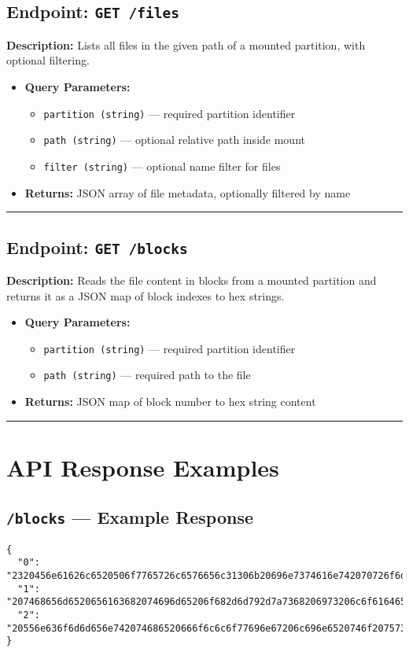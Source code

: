 \documentclass[12pt,a4paper]{article}
\begin{document}
\subsection*{Endpoint: \texttt{GET /files}}
\textbf{Description:} Lists all files in the given path of a mounted partition, with optional filtering.
\begin{itemize}[leftmargin=2cm,label={--}]
  \item \textbf{Query Parameters:}
  \begin{itemize}
    \item \texttt{partition (string)} — required partition identifier
    \item \texttt{path (string)} — optional relative path inside mount
    \item \texttt{filter (string)} — optional name filter for files
  \end{itemize}
  \item \textbf{Returns:} JSON array of file metadata, optionally filtered by name
\end{itemize}
\hrule\vspace{1em}

\subsection*{Endpoint: \texttt{GET /blocks}}
\textbf{Description:} Reads the file content in blocks from a mounted partition and returns it as a JSON map of block indexes to hex strings.
\begin{itemize}[leftmargin=2cm,label={--}]
  \item \textbf{Query Parameters:}
  \begin{itemize}
    \item \texttt{partition (string)} — required partition identifier
    \item \texttt{path (string)} — required path to the file
  \end{itemize}
  \item \textbf{Returns:} JSON map of block number to hex string content
\end{itemize}
\hrule\vspace{2em}



\section{API Response Examples}

\subsection*{\texttt{/blocks} — Example Response}
\begin{verbatim}
{
  "0": "2320456e61626c6520506f7765726c6576656c31306b20696e7374616e742070726f6d70742e...",
  "1": "207468656d6520656163682074696d65206f682d6d792d7a7368206973206c6f616465642c...",
  "2": "20556e636f6d6d656e742074686520666f6c6c6f77696e67206c696e6520746f2075736520..."
}
\end{verbatim}
\end{document}
